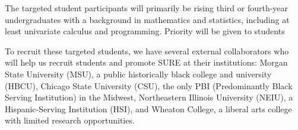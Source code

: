 \documentclass[11pt]{NSFamsart}
\newcommand{\MSIs}{\hyperlink{MSIlink}{MSIs}\xspace}
\newcommand{\scnote}[1]{{\color{green}SC: #1}}
\begin{document}



The targeted student participants will primarily be rising third or fourth-year undergraduates with a  background
in mathematics and statistics, including at least univariate calculus and programming.  Priority will be given to students 
To recruit these targeted students,  we have several external collaborators who will help us recruit students and promote SURE at their institutions: Morgan State University (MSU), a public historically black college and university (HBCU), Chicago State University (CSU), the only PBI (Predominantly Black Serving Institution) in the Midwest, Northeastern Illinois University (NEIU), a Hispanic-Serving Institution (HSI), and Wheaton College, a liberal arts college with limited research opportunities. 
\end{document}
